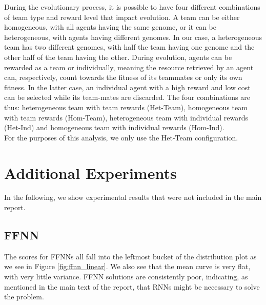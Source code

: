 \documentclass[12pt]{article}
\begin{document}
\begin{appendices}
During the evolutionary process, it is possible to have four different combinations of team type and reward level that impact evolution.
A team can be either homogeneous, with all agents having the same genome, or it can be heterogeneous, with agents having different genomes.
In our case, a heterogeneous team has two different genomes, with half the team having one genome and the other half of the team having the other.
During evolution, agents can be rewarded as a team or individually, meaning the resource retrieved by an agent can, respectively, count towards the fitness of its teammates or only its own fitness.
In the latter case, an individual agent with a high reward and low cost can be selected while its team-mates are discarded. 
The four combinations are thus: heterogeneous team with team rewards (Het-Team), homogeneous team with team rewards (Hom-Team), heterogeneous team with individual rewards (Het-Ind) and homogeneous team with individual rewards (Hom-Ind).\\

For the purposes of this analysis, we only use the Het-Team configuration.

\section{Additional Experiments}

In the following, we show experimental results that were not included in the main report.

\subsection{FFNN}\label{FFNN}

The scores for FFNNs all fall into the leftmost bucket of the distribution plot as we see in Figure \ref{fig:ffnn_linear}. We also see that the mean curve is very flat, with very little variance. FFNN solutions are consistently poor, indicating, as mentioned in the main text of the report, that RNNs might be necessary to solve the problem.

\begin{figure}[!tbp]
  \centering
  

\end{figure}
\end{appendices}
\end{document}
